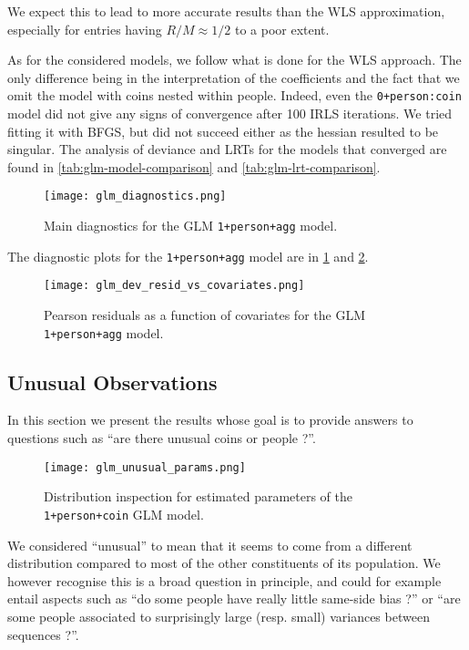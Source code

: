\documentclass[a4paper, 12pt,oneside]{article}
\begin{document}
			We expect this to lead to more accurate results than the WLS approximation, especially for entries having $R/M\approx 1/2$ to a poor extent.

			As for the considered models, we follow what is done for the WLS approach. The only difference being in the interpretation of the coefficients and the fact that we omit the model with coins nested within people. Indeed, even the \texttt{0+person:coin} model did not give any signs of convergence after 100 IRLS iterations. We tried fitting it with BFGS, but did not succeed either as the hessian resulted to be singular. The analysis of deviance and LRTs for the models that converged are found in \ref{tab:glm-model-comparison} and \ref{tab:glm-lrt-comparison}.
			\begin{figure}[htb]
				\centering
				\texttt{[image: glm\_diagnostics.png]}
				\caption{Main diagnostics for the GLM \texttt{1+person+agg} model.}
				\label{fig:glm-diagnostic}
			\end{figure}

			The diagnostic plots for the \texttt{1+person+agg} model are in \ref{fig:glm-diagnostic} and \ref{fig:dev-resid-vs-covariates}. 
			\begin{figure}[htb]
				\vspace{-1em}
				\centering
				\texttt{[image: glm\_dev\_resid\_vs\_covariates.png]}
				\caption{Pearson residuals as a function of covariates for the GLM \texttt{1+person+agg} model.}
				\label{fig:dev-resid-vs-covariates}
			\end{figure}	
		\subsection{Unusual Observations}
		In this section we present the results whose goal is to provide answers to questions such as ``are there unusual coins or people ?''. 
		\begin{figure}[h!]%
			\centering
			\texttt{[image: glm\_unusual\_params.png]}
			\caption{Distribution inspection for estimated parameters of the \texttt{1+person+coin} GLM model.}
			\label{fig:unusual-params}
		\end{figure}

		We considered ``unusual'' to mean that it seems to come from a different distribution compared to most of the other constituents of its population. We however recognise this is a broad question in principle, and could for example entail aspects such as ``do some people have really little same-side bias ?'' or ``are some people associated to surprisingly large (resp. small) variances between sequences ?''.
\end{document}
